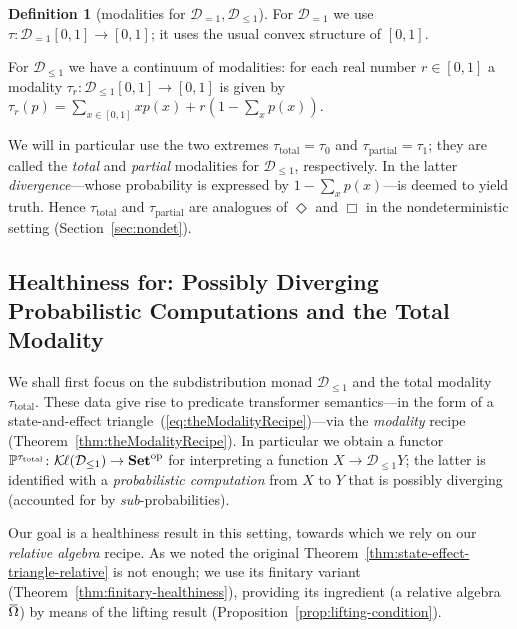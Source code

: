 \documentclass[9pt, preprint]{sigplanconf}
\theoremstyle{theorem}
\theoremstyle{definition}
\newtheorem{definition}[theorem]{Definition}
\renewcommand{\bar}{\overbar}
\newcommand{\overbar}[1]{\mkern 1.5mu\overline{\mkern-1.5mu#1\mkern-1.5mu}\mkern 1.5mu}
\newcommand{\dist}{\mathcal{D}_{=1}}
\newcommand{\sdist}{\mathcal{D}_{\le 1}}
\newcommand{\op}{\mathrm{op}}
\newcommand{\uintv}{[0, 1]}
\newcommand{\Set}{\mathbf{Set}}
\newcommand{\Sets}{\Set}
\newcommand{\Kl}{\mathcal{K}{\kern-.2ex}\ell}
\newcommand{\bbP}{\mathbb{P}}
\begin{document}
\begin{definition}[modalities for $\dist,\sdist$]
\label{def:probModalities}
 For $\dist$ we use
 \fussy
 $\tau\colon \dist[0,1]\to [0,1]$; it uses
 the usual convex structure of $[0,1]$.
 \sloppy

 For $\sdist$ we have a continuum of modalities:
 for each real number $r\in\uintv$ a modality
$\tau_r \colon \sdist{\uintv} \to \uintv$
 is given by
 $\tau_r(p) = \sum_{x \in \uintv} x p(x) + r (1 - \sum_x p(x))$.

 We will in particular use the two extremes
$\tau_{\mathrm{total}} = \tau_0$
and $\tau_{\mathrm{partial}} = \tau_1$; they are called
 the \emph{total} and \emph{partial} modalities for $\sdist$, respectively.
 In the latter \emph{divergence}---whose probability is expressed by
$1 - \sum_x p(x)$---is deemed to yield truth. Hence
$\tau_{\mathrm{total}}$
and $\tau_{\mathrm{partial}}$ are analogues of $\Diamond$ and $\Box$ in
the nondeterministic setting (Section~\ref{sec:nondet}).
\end{definition}






\subsection{Healthiness for: Possibly Diverging Probabilistic
  Computations
and the Total Modality}
\label{sub:subdist-monad-total}

We shall first focus on the subdistribution monad $\sdist$ and the
total modality $\tau_{\mathrm{total}}$. These data give rise to
predicate transformer semantics---in the form of a state-and-effect
triangle~(\ref{eq:theModalityRecipe})---via the \emph{modality} recipe
(Theorem~\ref{thm:theModalityRecipe}). In particular we obtain
a functor $\bbP^{\tau_{\mathrm{total}}}\colon \Kl(\sdist)\to
\Sets^{\op}$ for interpreting a function $X\to \sdist Y$; the latter is
identified with
a \emph{probabilistic computation} from $X$ to $Y$ that is possibly
diverging (accounted for by \emph{sub}-probabilities).

Our goal is a healthiness result in this setting, towards which we rely on our \emph{relative algebra}
recipe. As we noted the original
Theorem~\ref{thm:state-effect-triangle-relative} is not enough; we use
its finitary variant (Theorem~\ref{thm:finitary-healthiness}), providing
its ingredient (a relative algebra $\bar{\Omega}$) by means of the
lifting result (Proposition~\ref{prop:lifting-condition}).
\end{document}
